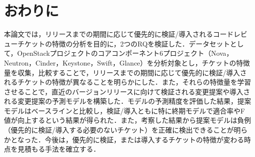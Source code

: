 \documentclass[T,J]{fose} %
\begin{document}
\section{おわりに}\label{sec:fig-tab-exp}
本論文では，リリースまでの期間に応じて優先的に検証/導入されるコードレビューチケットの特徴の分析を目的に，2つのRQを検証した．データセットとして，OpenStackプロジェクトのコアコンポーネント6プロジェクト（Nova，Neutron，Cinder，Keystone，Swift，Glance）を分析対象とし，チケットの特徴量を収集，比較することで，リリースまでの期間に応じて優先的に検証/導入されるチケットの特徴が異なることを明らかにした．また，それらの特徴量を学習させることで，直近のバージョンリリースに向けて検証される変更提案や導入される変更提案の予測モデルを構築した．モデルの予測精度を評価した結果，提案モデルはベースラインと比較し，検証/導入ともに特に終期モデルで適合率やF値が向上するという結果が得られた．また，考察した結果から提案モデルは負例（優先的に検証/導入する必要のないチケット）を正確に検出できることが明らかとなった．今後は，優先的に検証，または導入するチケットの特徴が変わる時点を見積もる手法を確立する．


%
%


%


\end{document}
